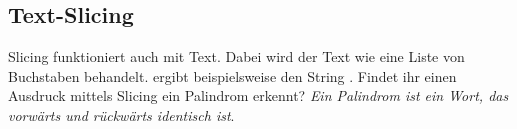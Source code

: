 \subsection{Text-Slicing }

Slicing funktioniert auch mit Text. Dabei wird der Text wie eine Liste von
Buchstaben behandelt.  ergibt beispielsweise den
String . Findet ihr einen Ausdruck mittels Slicing ein
Palindrom erkennt? \textit{Ein Palindrom ist ein Wort, das vorwärts und rückwärts
    identisch ist}.

